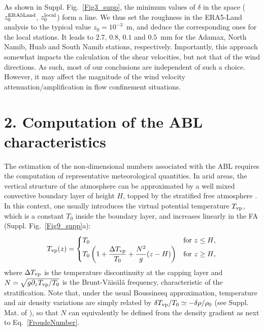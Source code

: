 As shown in Suppl. Fig.~\ref{Fig3_supp}, the minimum values of $\delta$ in the space ($z_{0}^{\textup{ERA5Land}}$, $z_{0}^{\textup{local}}$) form a line. We thus set the roughness in the ERA5-Land analysis to the typical value $z_0=10^{-3}$~m, and deduce the corresponding ones for the local stations. It leads to $2.7$, $0.8$, $0.1$ and $0.5$~mm for the Adamax, North Namib, Huab and South Namib stations, respectively. Importantly, this approach somewhat impacts the calculation of the shear velocities, but not that of the wind directions. As such, most of our conclusions are independent of such a choice. However, it may affect the magnitude of the wind velocity attenuation/amplification in flow confinement situations.


\section*{2. Computation of the ABL characteristics}

The estimation of the non-dimensional numbers associated with the ABL requires the computation of representative meteorological quantities. In arid areas, the vertical structure of the atmosphere can be approximated by a well mixed convective boundary layer of height $H$, topped by the stratified free atmosphere \citep{Stull1988, Shao2008}. In this context, one usually introduces the virtual potential temperature $T_{\textup{vp}}$, which is a constant $T_{0}$ inside the boundary layer, and increases linearly in the FA (Suppl. Fig.~\ref{Fig9_supp}a):
%
\begin{equation}
T_{\textup{vp}}(z) =
\begin{cases}
T_{0} &\text{for $z \leq H$},\\
T_{0}\left(1 + \displaystyle\frac{\Delta T_{\textup{vp}}}{T_{0}} + \frac{N^{2}}{g}(z - H)\right) &\text{for $ z \geq H$},
\end{cases}
\label{TvpVerticalProfile}
\end{equation}
%
where $\Delta T_{\textup{vp}}$ is the temperature discontinuity at the capping layer and $N = \sqrt{g \partial_z T_{\textup{vp}} / T_{0}}$ is the Brunt-V\"ais\"al\"a frequency, characteristic of the stratification. Note that, under the usual Boussinesq approximation, temperature and air density variations are simply related by $\delta T_{\textup{vp}}/T_{0} \simeq - \delta\rho/\rho_{0}$ (see Suppl. Mat. of \citet{andreotti2009}), so that $N$ can equivalently be defined from the density gradient as next to Eq.~\ref{FroudeNumber}.

